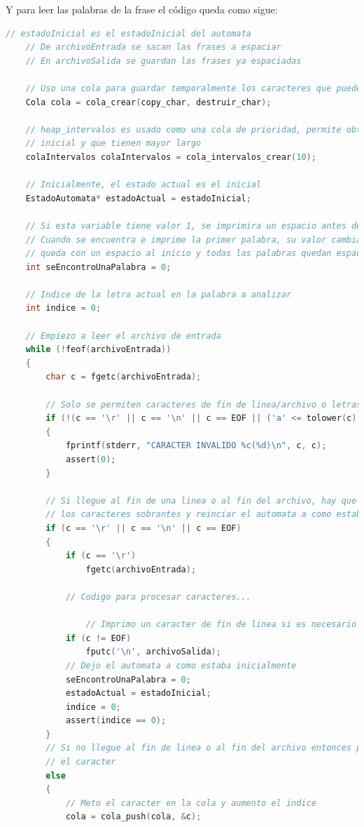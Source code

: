 \documentclass{article}
\begin{document}
Y para leer las palabras de la frase el código queda como sigue:

\begin{lstlisting}[language=C]
    // estadoInicial es el estadoInicial del automata
    // De archivoEntrada se sacan las frases a espaciar
    // En archivoSalida se guardan las frases ya espaciadas

    // Uso una cola para guardar temporalmente los caracteres que pueden formar una palabra a espaciar
    Cola cola = cola_crear(copy_char, destruir_char);

    // heap_intervalos es usado como una cola de prioridad, permite obtener los intervalos que tienen menor coordenada
    // inicial y que tienen mayor largo
    colaIntervalos colaIntervalos = cola_intervalos_crear(10);

    // Inicialmente, el estado actual es el inicial
    EstadoAutomata* estadoActual = estadoInicial;

    // Si esta variable tiene valor 1, se imprimira un espacio antes de mostrar una palabra encontrada
    // Cuando se encuentra e imprime la primer palabra, su valor cambia a 1. De esta forma la segunda palabra en adelante
    // queda con un espacio al inicio y todas las palabras quedan espaciadas
    int seEncontroUnaPalabra = 0;

    // Indice de la letra actual en la palabra a analizar
    int indice = 0;

    // Empiezo a leer el archivo de entrada
    while (!feof(archivoEntrada))
    {
        char c = fgetc(archivoEntrada);

        // Solo se permiten caracteres de fin de linea/archivo o letras del abecedario
        if (!(c == '\r' || c == '\n' || c == EOF || ('a' <= tolower(c) && tolower(c) <= 'z')))
        {
            fprintf(stderr, "CARACTER INVALIDO %c(%d)\n", c, c);
            assert(0);
        }

        // Si llegue al fin de una linea o al fin del archivo, hay que consumir
        // los caracteres sobrantes y reinciar el automata a como estaba inicialmente
        if (c == '\r' || c == '\n' || c == EOF)
        {
            if (c == '\r')
                fgetc(archivoEntrada);
            
            // Codigo para procesar caracteres...
            
                // Imprimo un caracter de fin de linea si es necesario
            if (c != EOF)
                fputc('\n', archivoSalida);
            // Dejo el automata a como estaba inicialmente
            seEncontroUnaPalabra = 0;
            estadoActual = estadoInicial;
            indice = 0;
            assert(indice == 0);
        }
        // Si no llegue al fin de linea o al fin del archivo entonces proceso
        // el caracter
        else
        {
            // Meto el caracter en la cola y aumento el indice
            cola = cola_push(cola, &c);



\end{lstlisting}
\end{document}
